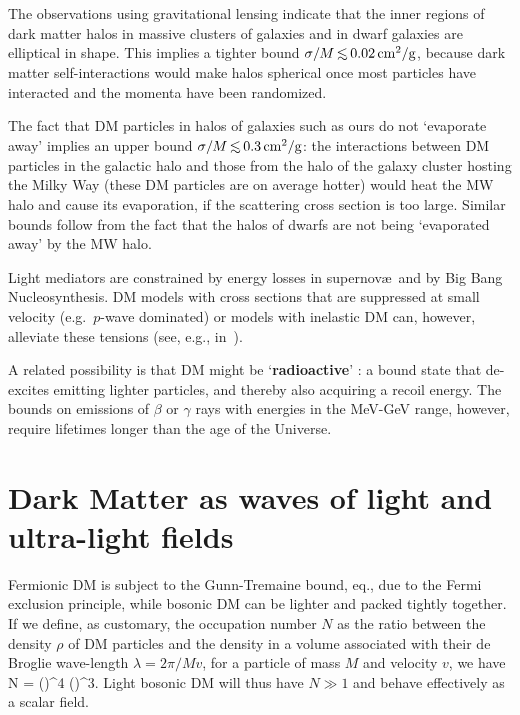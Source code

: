 The observations using gravitational lensing indicate that the inner regions of dark matter halos in massive clusters of galaxies and in dwarf galaxies are elliptical in shape. This implies a tighter bound $\sigma/M \circa{<} 0.02 \cm^2/{\rm g}$, because dark matter self-interactions would make halos spherical once most particles have interacted and the momenta have been randomized. 

The fact that DM particles in halos of galaxies such as ours do not `evaporate away' implies an upper bound $\sigma/M \circa{<} 0.3 \cm^2/{\rm g}$: the interactions between DM particles in the galactic halo and those from the halo of the galaxy cluster hosting the Milky Way (these DM particles are on average hotter) would heat the MW halo and cause its evaporation, if the scattering cross section is too large. 
Similar bounds follow from the fact that the halos of dwarfs are not being `evaporated away' by the MW halo.

Light mediators are constrained by energy losses in supernov\ae \ and by
Big Bang Nucleosynthesis.
DM models with cross sections that are suppressed at small velocity (e.g.\ $p$-wave dominated) or models with inelastic DM can, however, alleviate these tensions (see, e.g.,  in~\cite{SelfInteractingDM}).



\bigskip

A  related possibility is that DM might be `{\bf radioactive}' \cite{radioactiveDM}: 
a bound state that de-excites emitting lighter particles, and thereby also acquiring a recoil energy.
The bounds on emissions of $\beta$ or $\gamma$ rays with energies in the MeV-GeV range, however, require lifetimes longer than the age of the Universe.






\section{Dark Matter as waves of light and ultra-light fields}\label{ultralight}\label{LightBosonDM}

Fermionic DM is subject to the Gunn-Tremaine bound, eq., due to the Fermi exclusion principle, while bosonic DM can be lighter and packed tightly together. 
If we define, as customary, the occupation number $N$ as the ratio between the density $\rho$ of DM particles and the density in a volume associated with their de Broglie wave-length $\lambda =2\pi/Mv$, for a particle of mass $M$ and velocity $v$, we have
\beq 
N =  \approx \left(\right)^4 
\left(\right)^3.
\eeq
Light bosonic DM will thus have $N\gg1$ and behave effectively as a scalar field. 

